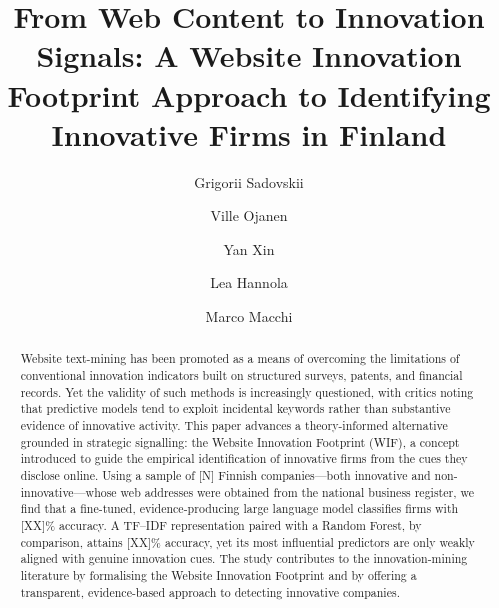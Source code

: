 \documentclass[runningheads]{llncs}
\begin{document}
%
%
\title{From Web Content to Innovation Signals: A Website Innovation Footprint
Approach to Identifying Innovative Firms in Finland}
%
%
\author{Grigorii Sadovskii \and
Ville Ojanen \and
Yan Xin\and
Lea Hannola \and
Marco Macchi}
%
%
%
%
\maketitle
%
\begin{abstract}
Website text-mining has been promoted as a means of overcoming the limitations of
conventional innovation indicators built on structured surveys, patents, and financial
records. Yet the validity of such methods is increasingly questioned, with critics
noting that predictive models tend to exploit incidental keywords rather than
substantive evidence of innovative activity. This paper advances a theory-informed
alternative grounded in strategic signalling: the Website Innovation Footprint (WIF), a
concept introduced to guide the empirical identification of innovative firms from the
cues they disclose online. Using a sample of [N] Finnish companies---both innovative
and non-innovative---whose web addresses were obtained from the national business
register, we find that a fine-tuned, evidence-producing large language model classifies
firms with [XX]\% accuracy. A TF--IDF representation paired with a Random Forest, by
comparison, attains [XX]\% accuracy, yet its most influential predictors are only weakly
aligned with genuine innovation cues. The study contributes to the innovation-mining
literature by formalising the Website Innovation Footprint and by offering a
transparent, evidence-based approach to detecting innovative companies.
\end{abstract}
%
%
\end{document}
